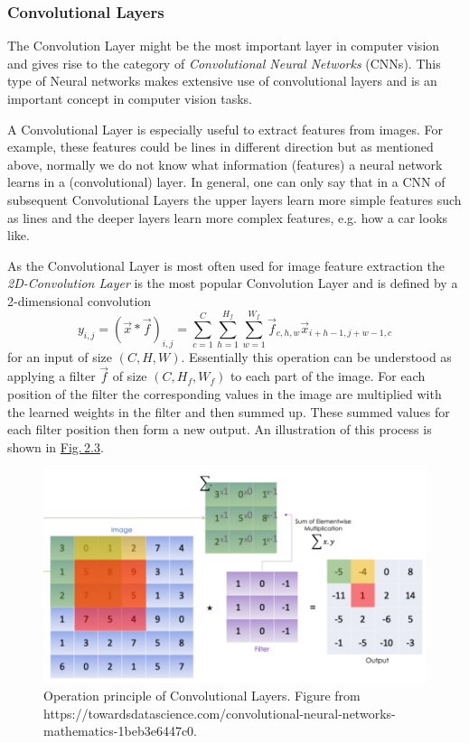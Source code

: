 \subsubsection{Convolutional Layers}
The Convolution Layer might be the most important layer in computer vision and gives rise to the category of \textit{Convolutional Neural Networks} (CNNs). This type of Neural networks makes extensive use of convolutional layers and is an important concept in computer vision tasks.

A Convolutional Layer is especially useful to extract features from images. For example, these features could be lines in different direction but as mentioned above, normally we do not know what information (features) a neural network learns in a (convolutional) layer. In general, one can only say that in a CNN of subsequent Convolutional Layers the upper layers learn more simple features such as lines and the deeper layers learn more complex features, e.g. how a car looks like.

As the Convolutional Layer is most often used for image feature extraction the \textit{2D-Convolution Layer} is the most popular Convolution Layer and is defined by a 2-dimensional convolution
%
\begin{equation}
    y_{i,j}=(\vec{x}\ast\vec{f})_{i,j}=\sum_{c=1}^{C}\sum_{h=1}^{H_f}\sum_{w=1}^{W_f}\vec{f}_{c,h,w}\vec{x}_{i+h-1,j+w-1,c}
\end{equation}
%
for an input of size $(C,H,W)$. Essentially this operation can be understood as applying a filter $\vec{f}$ of size $(C, H_f, W_f)$ to each part of the image. For each position of the filter the corresponding values in the image are multiplied with the learned weights in the filter and then summed up. These summed values for each filter position then form a new output. An illustration of this process is shown in \hyperref[fig:2.3]{Fig.\,2.3}.
%
\begin{figure} \label{fig:2.3}
    \centering
    \includegraphics[width=.65\textwidth]{Chapters/figures/convolution.PNG}
    \caption[Operation principle of Convolutional Layers]{Operation principle of Convolutional Layers. Figure from\\ https://towardsdatascience.com/convolutional-neural-networks-mathematics-1beb3e6447c0.}
\end{figure}
%


